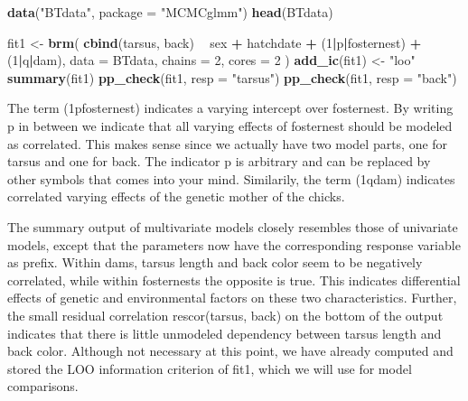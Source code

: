\documentclass[]{book}
\newenvironment{Shaded}{\begin{snugshade}}{\end{snugshade}}
\newcommand{\KeywordTok}[1]{\textcolor[rgb]{0.13,0.29,0.53}{\textbf{#1}}}
\newcommand{\DataTypeTok}[1]{\textcolor[rgb]{0.13,0.29,0.53}{#1}}
\newcommand{\DecValTok}[1]{\textcolor[rgb]{0.00,0.00,0.81}{#1}}
\newcommand{\StringTok}[1]{\textcolor[rgb]{0.31,0.60,0.02}{#1}}
\newcommand{\OperatorTok}[1]{\textcolor[rgb]{0.81,0.36,0.00}{\textbf{#1}}}
\newcommand{\NormalTok}[1]{#1}
\begin{document}
\begin{Shaded}
\begin{Highlighting}[]
\KeywordTok{data}\NormalTok{(}\StringTok{"BTdata"}\NormalTok{, }\DataTypeTok{package =} \StringTok{"MCMCglmm"}\NormalTok{)}
\KeywordTok{head}\NormalTok{(BTdata)}
\end{Highlighting}
\end{Shaded}

\begin{Shaded}
\begin{Highlighting}[]
\NormalTok{fit1 <-}\StringTok{ }\KeywordTok{brm}\NormalTok{(}
  \KeywordTok{cbind}\NormalTok{(tarsus, back) }\OperatorTok{~}\StringTok{ }\NormalTok{sex }\OperatorTok{+}\StringTok{ }\NormalTok{hatchdate }\OperatorTok{+}\StringTok{ }\NormalTok{(}\DecValTok{1}\OperatorTok{|}\NormalTok{p}\OperatorTok{|}\NormalTok{fosternest) }\OperatorTok{+}\StringTok{ }\NormalTok{(}\DecValTok{1}\OperatorTok{|}\NormalTok{q}\OperatorTok{|}\NormalTok{dam),}
  \DataTypeTok{data =}\NormalTok{ BTdata, }\DataTypeTok{chains =} \DecValTok{2}\NormalTok{, }\DataTypeTok{cores =} \DecValTok{2}
\NormalTok{)}
\KeywordTok{add_ic}\NormalTok{(fit1) <-}\StringTok{ "loo"}
\KeywordTok{summary}\NormalTok{(fit1)}
\KeywordTok{pp_check}\NormalTok{(fit1, }\DataTypeTok{resp =} \StringTok{"tarsus"}\NormalTok{)}
\KeywordTok{pp_check}\NormalTok{(fit1, }\DataTypeTok{resp =} \StringTok{"back"}\NormalTok{)}
\end{Highlighting}
\end{Shaded}

The term (1\textbar{}p\textbar{}fosternest) indicates a varying
intercept over fosternest. By writing \textbar{}p\textbar{} in between
we indicate that all varying effects of fosternest should be modeled as
correlated. This makes sense since we actually have two model parts, one
for tarsus and one for back. The indicator p is arbitrary and can be
replaced by other symbols that comes into your mind. Similarily, the
term (1\textbar{}q\textbar{}dam) indicates correlated varying effects of
the genetic mother of the chicks.

The summary output of multivariate models closely resembles those of
univariate models, except that the parameters now have the corresponding
response variable as prefix. Within dams, tarsus length and back color
seem to be negatively correlated, while within fosternests the opposite
is true. This indicates differential effects of genetic and
environmental factors on these two characteristics. Further, the small
residual correlation rescor(tarsus, back) on the bottom of the output
indicates that there is little unmodeled dependency between tarsus
length and back color. Although not necessary at this point, we have
already computed and stored the LOO information criterion of fit1, which
we will use for model comparisons.
\end{document}
